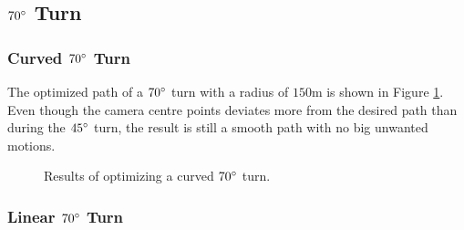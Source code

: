 \subsection{$70\degree$ Turn}

\subsubsection{Curved $70\degree$ Turn}

The optimized path of a $70\degree$ turn with a radius of $150$m is shown in Figure \ref{fig:turns_cur_70deg_pos}. Even though the camera centre points deviates more from the desired path than during the $45\degree$ turn, the result is still a smooth path with no big unwanted motions.

\begin{figure}
	\caption{Results of optimizing a curved $70\degree$ turn.}
	\label{fig:turns_cur_70deg_pos}
\end{figure}


\subsubsection{Linear $70\degree$ Turn}

